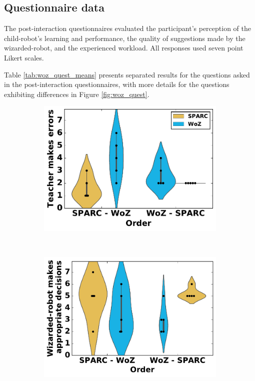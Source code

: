 \subsection{Questionnaire data}

The post-interaction questionnaires evaluated the participant's perception of the child-robot's learning and performance, the quality of suggestions made by the wizarded-robot, and the experienced workload. All responses used seven point Likert scales.

Table \ref{tab:woz_quest_means} presents separated results for the questions asked in the post-interaction questionnaires, with more details for the questions exhibiting differences in Figure \ref{fig:woz_quest}.

\begin{figure}[ht]
	\centering
	\begin{subfigure}[t]{0.3295\textwidth}
		\centering
		\includegraphics[width=1.\textwidth]{errors.pdf}
	\end{subfigure}%
	~ 
	\begin{subfigure}[t]{0.341\textwidth}
		\centering
		\includegraphics[width=1.\textwidth]{appropriate.pdf}

\end{subfigure}
\end{figure}
